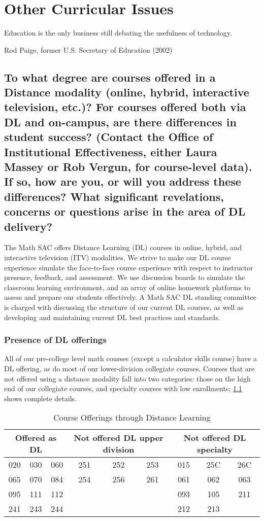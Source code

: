 \chapter{Other  Curricular Issues}\label{chap:otherissues}
\epigraph{Education is the only business still debating the usefulness of
	technology.}{Rod Paige, former U.S. Secretary of Education (2002)}
\section[Distance education]{To what degree are courses offered in a Distance
 modality (online, hybrid, interactive television, etc.)? For courses offered
 both via DL and on-campus, are there differences in student success? (Contact
 the Office of Institutional Effectiveness, either Laura Massey or Rob Vergun,
 for course-level data). If so, how are you, or will you address these
 differences? What significant revelations, concerns or questions arise in the
 area of DL delivery?}\label{other:sec:distancelearning}

The Math SAC offers Distance Learning (DL) courses in online, hybrid, and
interactive television (ITV) modalities.  We strive to make our DL course
experience simulate the face-to-face course experience with respect to
instructor presence, feedback, and assessment. We use discussion boards to
simulate the classroom learning environment, and an array of online homework
platforms to assess and prepare our students effectively. A Math SAC DL standing
committee is charged with discussing the structure of our current DL courses, as
well as developing and maintaining current DL best practices and standards.

\subsection{Presence of DL offerings}
All of our pre-college level math courses (except a calculator skills course)
have a DL offering, as do most of our lower-division collegiate courses.
Courses that are not offered using a distance modality fall into two categories:
those on the high end of our collegiate courses, and specialty courses with low
enrollments; \cref{tab:sec3:DLofferings} shows complete details.

\begin{table}
	\caption{Course Offerings through Distance Learning}\label{tab:sec3:DLofferings}
	\centering
	\begin{tabular}{ccccccccc}
		\toprule
		\multicolumn{3}{p{1in}}{Offered as DL} & \multicolumn{3}{p{1in}}{Not offered  DL upper division} & \multicolumn{3}{p{1in}}{Not offered  DL specialty}\\
		\midrule
		020 & 030 & 060 & 251 & 252 & 253 & 015 & 25C & 26C \\
		065 & 070 & 084 & 254 & 256 & 261 & 061 & 062 & 063 \\
		095 & 111 & 112 &     &     &     & 093 & 105 & 211 \\
		241& 243& 244&		&&&					212& 213\\
		\bottomrule
	\end{tabular}
\end{table}

